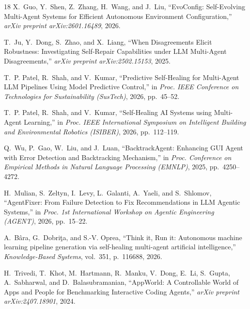 \documentclass[conference]{IEEEtran}
\begin{document}
\begin{thebibliography}{18}
X.~Guo, Y.~Shen, Z.~Zhang, H.~Wang, and J.~Liu,
``EvoConfig: Self-Evolving Multi-Agent Systems for Efficient Autonomous Environment Configuration,''
\textit{arXiv preprint arXiv:2601.16489}, 2026.

T.~Ju, Y.~Dong, S.~Zhao, and X.~Liang,
``When Disagreements Elicit Robustness: Investigating Self-Repair Capabilities under LLM Multi-Agent Disagreements,''
\textit{arXiv preprint arXiv:2502.15153}, 2025.

T.~P. Patel, R.~Shah, and V.~Kumar,
``Predictive Self-Healing for Multi-Agent LLM Pipelines Using Model Predictive Control,''
in \textit{Proc. IEEE Conference on Technologies for Sustainability (SusTech)}, 2026, pp.~45--52.

T.~P. Patel, R.~Shah, and V.~Kumar,
``Self-Healing AI Systems using Multi-Agent Learning,''
in \textit{Proc. IEEE International Symposium on Intelligent Building and Environmental Robotics (ISIBER)}, 2026, pp.~112--119.

Q.~Wu, P.~Gao, W.~Liu, and J.~Luan,
``BacktrackAgent: Enhancing GUI Agent with Error Detection and Backtracking Mechanism,''
in \textit{Proc. Conference on Empirical Methods in Natural Language Processing (EMNLP)}, 2025, pp.~4250--4272.

H.~Mulian, S.~Zeltyn, I.~Levy, L.~Galanti, A.~Yaeli, and S.~Shlomov,
``AgentFixer: From Failure Detection to Fix Recommendations in LLM Agentic Systems,''
in \textit{Proc. 1st International Workshop on Agentic Engineering (AGENT)}, 2026, pp.~15--22.

A.~B{\^a}ra, G.~Dobri{\c{t}}a, and S.-V. Oprea,
``Think it, Run it: Autonomous machine learning pipeline generation via self-healing multi-agent artificial intelligence,''
\textit{Knowledge-Based Systems}, vol.~351, p.~116688, 2026.

H.~Trivedi, T.~Khot, M.~Hartmann, R.~Manku, V.~Dong, E.~Li, S.~Gupta, A.~Sabharwal, and D.~Balasubramanian,
``AppWorld: A Controllable World of Apps and People for Benchmarking Interactive Coding Agents,''
\textit{arXiv preprint arXiv:2407.18901}, 2024.

\end{thebibliography}
\end{document}
